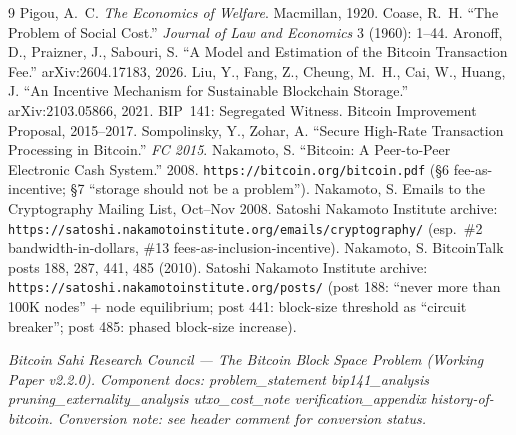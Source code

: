 \documentclass[11pt]{article}
\begin{document}
\begin{thebibliography}{9}
 Pigou, A.~C. \emph{The Economics of Welfare}. Macmillan, 1920.
 Coase, R.~H. ``The Problem of Social Cost.'' \emph{Journal of Law and Economics} 3 (1960): 1--44.
 Aronoff, D., Praizner, J., Sabouri, S. ``A Model and Estimation of the Bitcoin Transaction Fee.'' arXiv:2604.17183, 2026.
 Liu, Y., Fang, Z., Cheung, M.~H., Cai, W., Huang, J. ``An Incentive Mechanism for Sustainable Blockchain Storage.'' arXiv:2103.05866, 2021.
 BIP~141: Segregated Witness. Bitcoin Improvement Proposal, 2015--2017.
 Sompolinsky, Y., Zohar, A. ``Secure High-Rate Transaction Processing in Bitcoin.'' \emph{FC 2015}.
 Nakamoto, S. ``Bitcoin: A Peer-to-Peer Electronic Cash System.'' 2008. \texttt{https://bitcoin.org/bitcoin.pdf} (\S6 fee-as-incentive; \S7 ``storage should not be a problem'').
 Nakamoto, S. Emails to the Cryptography Mailing List, Oct--Nov 2008. Satoshi Nakamoto Institute archive: \texttt{https://satoshi.nakamotoinstitute.org/emails/cryptography/} (esp.\ \#2 bandwidth-in-dollars, \#13 fees-as-inclusion-incentive).
 Nakamoto, S. BitcoinTalk posts 188, 287, 441, 485 (2010). Satoshi Nakamoto Institute archive: \texttt{https://satoshi.nakamotoinstitute.org/posts/} (post 188: ``never more than 100K nodes'' + node equilibrium; post 441: block-size threshold as ``circuit breaker''; post 485: phased block-size increase).
\end{thebibliography}

\vfill
\noindent\footnotesize\textit{Bitcoin Sahi Research Council --- The Bitcoin Block Space Problem (Working Paper v2.2.0). Component docs: problem\_statement \textbullet{} bip141\_analysis \textbullet{} pruning\_externality\_analysis \textbullet{} utxo\_cost\_note \textbullet{} verification\_appendix \textbullet{} history-of-bitcoin. Conversion note: see header comment for conversion status.}
\end{document}
